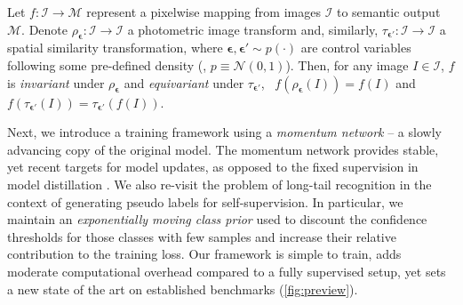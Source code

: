 Let $f: \mathcal{I} \rightarrow \mathcal{M}$ represent a pixelwise mapping from images $\mathcal{I}$ to semantic output $\mathcal{M}$.
Denote $\rho_{\bm{\epsilon}}: \mathcal{I} \rightarrow \mathcal{I}$ a photometric image transform and, similarly, $\tau_{\bm{\epsilon}'}: \mathcal{I} \rightarrow \mathcal{I}$ a spatial similarity transformation, where $\bm{\epsilon},\bm{\epsilon}'\sim p(\cdot)$ are control variables following some pre-defined density (\eg, $p \equiv \mathcal{N}(0, 1)$).
Then, for any image $I \in \mathcal{I}$, $f$ is \emph{invariant} under $\rho_{\bm{\epsilon}}$ and \emph{equivariant} under $\tau_{\bm{\epsilon}'}$, \ie~$f(\rho_{\bm{\epsilon}}(I)) = f(I)$ and $f(\tau_{\bm{\epsilon}'}(I)) = \tau_{\bm{\epsilon}'}(f(I))$.

\smallskip
\noindent Next, we introduce a training framework using a \emph{momentum network} -- a slowly advancing copy of the original model.
The momentum network provides stable, yet recent targets for model updates, as opposed to the fixed supervision in model distillation \cite{Chen0G18,Zheng_2020_IJCV,ZhengY20}.
We also re-visit the problem of long-tail recognition in the context of generating pseudo labels for self-supervision.
In particular, we maintain an \emph{exponentially moving class prior} used to discount the confidence thresholds for those classes with few samples and increase their relative contribution to the training loss.
Our framework is simple to train, adds moderate computational overhead compared to a fully supervised setup, yet sets a new state of the art on established benchmarks (\cf \cref{fig:preview}).
